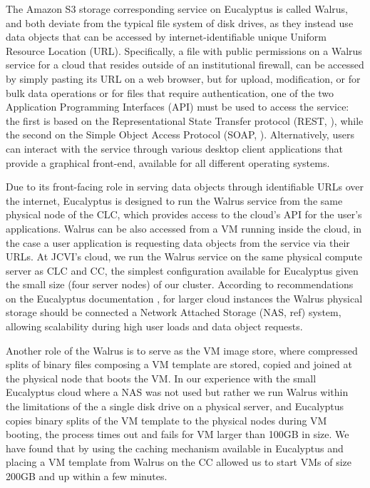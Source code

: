 \documentclass[10pt]{bmc_article}
\newenvironment{bmcformat}{\baselineskip20pt\sloppy\setboolean{publ}{false}}{\baselineskip20pt\sloppy}
\begin{document}
\begin{bmcformat}
The Amazon S3 storage corresponding service on Eucalyptus is called Walrus, and both deviate from the typical file system of disk drives, as they 
instead use data objects that can be accessed by internet-identifiable unique Uniform Resource Location (URL). Specifically, a file with public permissions 
on a Walrus service for a cloud that resides outside of an institutional firewall, can be accessed by simply pasting its URL on a web browser, but for 
upload, modification, or for bulk data operations or for files that require authentication, one of the two Application Programming Interfaces (API) must 
be used to  access the service: the first is based on the Representational State Transfer protocol (REST, \cite{fielding2000}), while the second on the Simple 
Object Access Protocol (SOAP, \cite{soap}).  Alternatively, users can interact with the service through various desktop client applications that provide
a graphical front-end, available for all different operating systems\cite{cyberduck, s3browse,s3fox}. \pb

Due to its front-facing role in serving data objects through identifiable URLs over the internet, Eucalyptus is designed to run the Walrus
service from the same physical node of the CLC, which provides access to the cloud's API for the user's applications. Walrus can be also 
accessed from a VM running inside the cloud, in the case a user application is requesting data objects from the service via their URLs. At 
JCVI's cloud, we run the Walrus service on the same physical compute server as CLC and CC, the simplest configuration available for 
Eucalyptus given the small size (four server nodes) of our cluster. According to recommendations on the  Eucalyptus documentation \cite{eucadocs},
for larger cloud instances the Walrus physical storage should be connected a Network Attached Storage (NAS, ref) system, allowing scalability
during high user loads and data object requests. 

Another role of the Walrus is to serve as the VM image store, where compressed splits of binary files composing a VM template are stored, 
copied and joined at the physical node that boots the VM. In our experience with the small Eucalyptus cloud where a NAS  was not used but rather 
we run Walrus within the limitations of the a single disk drive on a physical server, and Eucalyptus copies binary splits of the VM 
template to the physical nodes during VM booting,  the process times out and fails for VM larger than 100GB in size. We have found that by using 
the caching mechanism available in Eucalyptus and placing a VM template from Walrus on the CC \cite{eucacache} allowed us to start VMs of size 200GB
and up within a few minutes.


\end{bmcformat}
\end{document}
